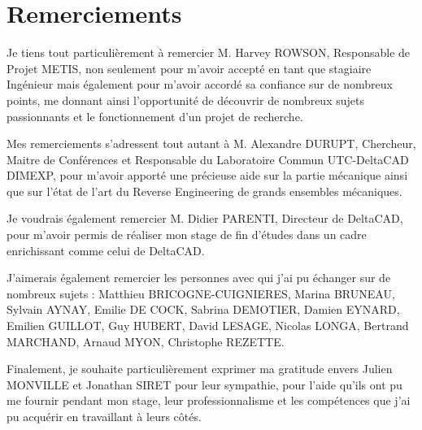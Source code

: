 \chapter*{Remerciements}
\setcounter{page}{3}


Je tiens tout particulièrement à remercier M. Harvey ROWSON, Responsable de Projet METIS, non seulement pour m’avoir accepté en tant que stagiaire Ingénieur mais également pour m’avoir accordé sa confiance sur de nombreux points, me donnant ainsi l’opportunité de découvrir de nombreux sujets passionnants et le fonctionnement d'un projet de recherche. 

Mes remerciements s’adressent tout autant à M. Alexandre DURUPT, Chercheur, Maitre de Conférences et Responsable du Laboratoire Commun UTC-DeltaCAD DIMEXP, pour m'avoir apporté une précieuse aide sur la partie mécanique ainsi que sur l'état de l'art du Reverse Engineering de grands ensembles mécaniques.

Je voudrais également remercier M. Didier PARENTI, Directeur de DeltaCAD, pour m'avoir permis de réaliser mon stage de fin d'études dans un cadre enrichissant comme celui de DeltaCAD.

J’aimerais également remercier les personnes avec qui j'ai pu échanger sur de nombreux sujets : Matthieu BRICOGNE-CUIGNIERES, Marina BRUNEAU, Sylvain AYNAY, Emilie DE COCK, Sabrina DEMOTIER, Damien EYNARD, Emilien GUILLOT, Guy HUBERT, David LESAGE, Nicolas LONGA, Bertrand MARCHAND, Arnaud MYON, Christophe REZETTE. 

Finalement, je souhaite particulièrement exprimer ma gratitude envers Julien MONVILLE et Jonathan\- SIRET pour leur sympathie, pour l’aide qu’ils ont pu me fournir pendant mon stage, leur professionnalisme et les compétences que j’ai pu acquérir en travaillant à leurs côtés.
